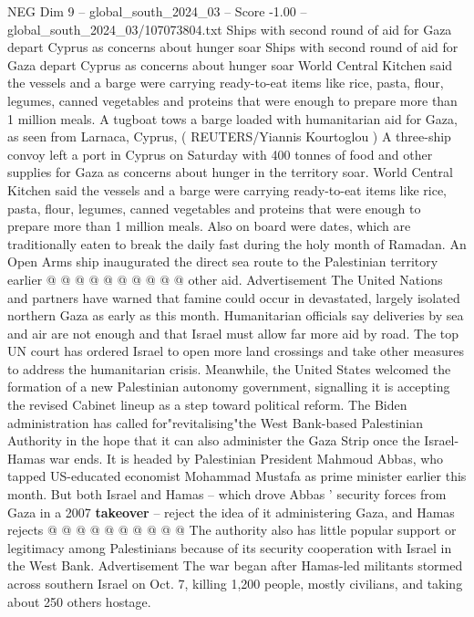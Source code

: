 \begin{textsample}{NEG Dim 9 – global\_south\_2024\_03 – Score -1.00 – global\_south\_2024\_03/107073804.txt}  \label{ex:f9_neg_413}
Ships with second round of aid for Gaza depart Cyprus as concerns about hunger soar Ships with second round of aid for Gaza depart Cyprus as concerns about hunger soar World Central Kitchen said the vessels and a barge were carrying ready-to-eat items like rice, pasta, flour, legumes, canned vegetables and proteins that were enough to prepare more than 1 million meals.
A tugboat tows a barge loaded with humanitarian aid for Gaza, as seen from Larnaca, Cyprus, ( REUTERS/Yiannis Kourtoglou ) A three-ship convoy left a port in Cyprus on Saturday with 400 tonnes of food and other supplies for Gaza as concerns about hunger in the territory soar.
World Central Kitchen said the vessels and a barge were carrying ready-to-eat items like rice, pasta, flour, legumes, canned vegetables and proteins that were enough to prepare more than 1 million meals.
Also on board were dates, which are traditionally eaten to break the daily fast during the holy month of Ramadan.
An Open Arms ship inaugurated the direct sea route to the Palestinian territory earlier @ @ @ @ @ @ @ @ @ @ other aid.
Advertisement The United Nations and partners have warned that famine could occur in devastated, largely isolated northern Gaza as early as this month.
Humanitarian officials say deliveries by sea and air are not enough and that Israel must allow far more aid by road.
The top UN court has ordered Israel to open more land crossings and take other measures to address the humanitarian crisis.
Meanwhile, the United States welcomed the formation of a new Palestinian autonomy government, signalling it is accepting the revised Cabinet lineup as a step toward political reform.
The Biden administration has called for"revitalising"the West Bank-based Palestinian Authority in the hope that it can also administer the Gaza Strip once the Israel-Hamas war ends.
It is headed by Palestinian President Mahmoud Abbas, who tapped US-educated economist Mohammad Mustafa as prime minister earlier this month.
But both Israel and Hamas -- which drove Abbas ' security forces from Gaza in a 2007 \textbf{takeover} -- reject the idea of it administering Gaza, and Hamas rejects @ @ @ @ @ @ @ @ @ @ The authority also has little popular support or legitimacy among Palestinians because of its security cooperation with Israel in the West Bank.
Advertisement The war began after Hamas-led militants stormed across southern Israel on Oct. 7, killing 1,200 people, mostly civilians, and taking about 250 others hostage.

\end{textsample}
